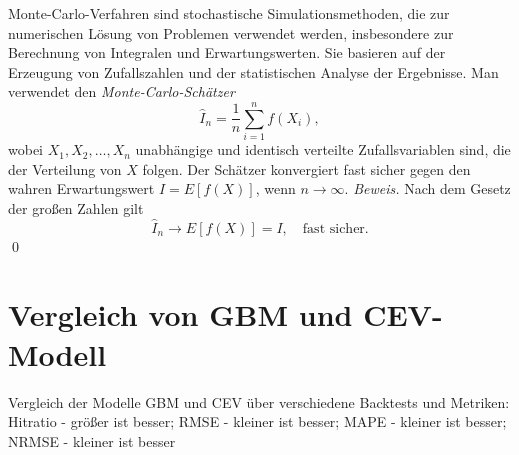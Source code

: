 \begin{defprop}
Monte-Carlo-Verfahren sind stochastische Simulationsmethoden, die zur numerischen
Lösung von Problemen verwendet werden, insbesondere zur Berechnung von Integralen
und Erwartungswerten. Sie basieren auf der Erzeugung von Zufallszahlen und
der statistischen Analyse der Ergebnisse. Man verwendet den \textit{Monte-Carlo-Schätzer}
$$
\hat{I}_n = \frac{1}{n} \sum_{i=1}^n f(X_i),
$$
wobei $X_1, X_2, \ldots, X_n$ unabhängige und identisch verteilte Zufallsvariablen
sind, die der Verteilung von $X$ folgen. Der Schätzer konvergiert fast sicher
gegen den wahren Erwartungswert $I = E[f(X)]$, wenn $n \to \infty$.
\textit{Beweis.} Nach dem Gesetz der großen Zahlen gilt
$$\hat{I}_n \longrightarrow E[f(X)] = I, \quad \text{fast sicher.}$$
\qed
\end{defprop}
\newpage
\section{Vergleich von GBM und CEV-Modell}
\begin{table}[H]
    \centering
    \begin{sideways}
    \end{sideways}
    \caption{Vergleich der Modelle GBM und CEV über verschiedene Backtests und Metriken: Hitratio - größer ist besser; RMSE - kleiner ist besser; MAPE - kleiner ist besser; NRMSE - kleiner ist besser} 
    \label{fig:table_gbm_cev}
\end{table}